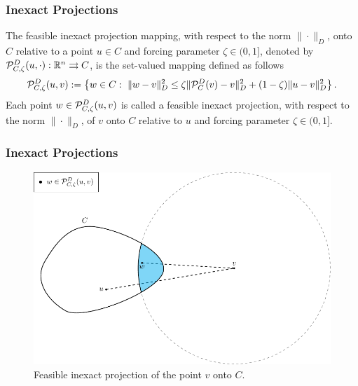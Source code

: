 \begin{frame}
  \frametitle{Inexact Projections}

  \begin{definition}[2.5]
    The \textcolor{UFGred}{feasible inexact projection mapping}, with respect to the norm $\| \cdot \|_{D}$,   onto $C$  relative to a point  $u \in C$ and forcing parameter $\zeta\in (0, 1]$, denoted by ${\cal P}_{C,\zeta}^{D}(u,  \cdot): {\mathbb R}^n \rightrightarrows C$,  is the set-valued mapping defined as follows
    \begin{equation*}
      {\cal P}_{C,\zeta}^{D}(u, v) := \left\{w\in C:~ \|w-v\|_{D}^2\leq \zeta \| {\cal P}_{C}^{D}(v)-v\|_{D}^2+(1-\zeta)\|u-v\|_{D}^2 \right\}.
    \end{equation*}
    Each point $w\in {\cal P}_{C,\zeta}^{D}(u, v) $ is called a  \textcolor{UFGred}{feasible inexact projection},  with respect to the norm $\| \cdot \|_{D}$,  of $v$ onto $C$ relative to $u$ and forcing parameter $\zeta\in (0, 1]$.
  \end{definition}
\end{frame}

\begin{frame}[t]\frametitle{Inexact Projections}\bigskip
  \begin{figure}[H]
    \centering
    \includegraphics[height=0.725\textheight]{../figures/martinezProj.pdf}
    \caption{Feasible inexact projection of the point $v$ onto $C$.}
    \label{fig:martinezProj}
  \end{figure}
\end{frame}


